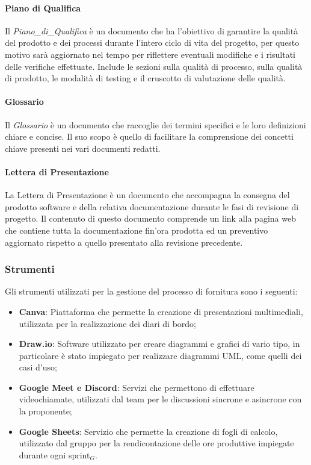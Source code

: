 \documentclass[10pt]{article}
\begin{document}
\begin{justify}
        \paragraph{Piano di Qualifica}
        Il \textit{Piano\_di\_Qualifica} è un documento che ha l'obiettivo di garantire la qualità del prodotto e dei processi durante l'intero ciclo di vita del progetto, per questo motivo sarà aggiornato nel tempo per riflettere eventuali modifiche e i risultati delle verifiche effettuate. Include le sezioni sulla qualità di processo, sulla qualità di prodotto, le modalità di testing e il cruscotto di valutazione delle qualità.\\

        \paragraph{Glossario}
        Il \textit{Glossario} è un documento che raccoglie dei termini specifici e le loro definizioni chiare e concise. Il suo scopo è quello di facilitare la comprensione dei concetti chiave presenti nei vari documenti redatti.\\

        \paragraph{Lettera di Presentazione}
        La Lettera di Presentazione è un documento che accompagna la consegna del prodotto software e della relativa documentazione durante le fasi di revisione di progetto. Il contenuto di questo documento comprende un link alla pagina web che contiene tutta la documentazione fin'ora prodotta ed un preventivo aggiornato rispetto a quello presentato alla revisione precedente.\\

    \subsubsection{Strumenti}
    Gli strumenti utilizzati per la gestione del processo di fornitura sono i seguenti:
    \begin{itemize}
        \item \textbf{Canva}: Piattaforma che permette la creazione di presentazioni multimediali, utilizzata per la realizzazione dei diari di bordo;
        \item \textbf{Draw.io}: Software utilizzato per creare diagrammi e grafici di vario tipo, in particolare è stato impiegato per realizzare diagrammi UML, come quelli dei casi d'uso;
        \item \textbf{Google Meet e Discord}: Servizi che permettono di effettuare videochiamate, utilizzati dal team per le discussioni sincrone e asincrone con la proponente;
        \item \textbf{Google Sheets}: Servizio che permette la creazione di fogli di calcolo, utilizzato dal gruppo per la rendicontazione delle ore produttive impiegate durante ogni sprint$_G$.
    \end{itemize}


\end{justify}
\end{document}
